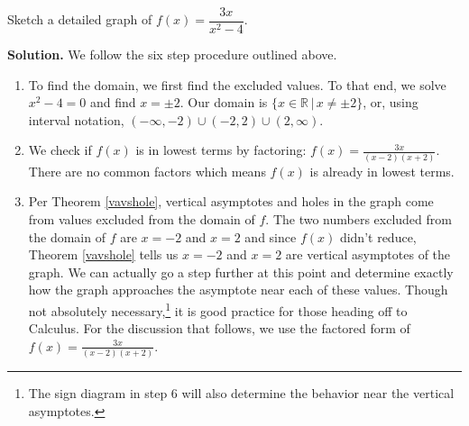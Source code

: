 \begin{ex}  Sketch a detailed graph of $f(x) = \dfrac{3x}{x^2-4}$.

{\bf Solution.}  We follow the six step procedure outlined above.

\begin{enumerate}

\item  To find the domain, we first find the excluded values.  To that end, we solve  $x^2 - 4 = 0$ and find $x = \pm 2$. Our domain is $\{ x \in \mathbb{R} \, | \,  x \neq \pm 2\}$, or, using interval notation,  $(-\infty, -2) \cup (-2,2) \cup (2,\infty)$.

\item  We check if  $f(x)$ is in lowest terms by factoring: $f(x) = \frac{3x}{(x-2)(x+2)}$.  There are no common factors which means $f(x)$ is already in lowest terms.

\item  Per Theorem \ref{vavshole}, vertical asymptotes and holes in the graph come from values excluded from the domain of $f$.  The two numbers excluded from the domain of $f$ are $x = -2$ and $x=2$ and since  $f(x)$ didn't reduce,  Theorem \ref{vavshole} tells us $x=-2$ and $x=2$ are vertical asymptotes of the graph.  We can actually go a step further at this point and determine exactly how the graph approaches the asymptote near each of these values. Though not absolutely necessary,\footnote{The sign diagram in step 6 will also determine the behavior near the vertical asymptotes.} it is good practice for those heading off to Calculus.  For the discussion that follows,  we use the factored form of $f(x) = \frac{3x}{(x-2)(x+2)}$.

\begin{itemize}


\end{itemize}
\end{enumerate}
\end{ex}
